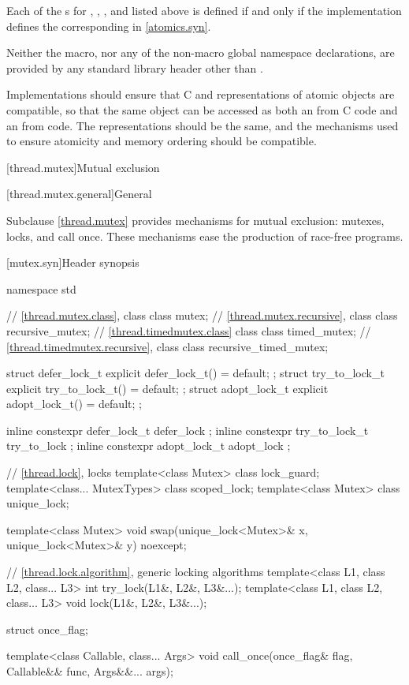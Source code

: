 \pnum
Each of the s for
, , , and 
listed above is defined if and only if the implementation defines
the corresponding  in \ref{atomics.syn}.

\pnum
Neither the  macro,
nor any of the non-macro global namespace declarations,
are provided by any \Cpp{} standard library header
other than .

\pnum
\recommended
Implementations should ensure
that C and \Cpp{} representations of atomic objects are compatible,
so that the same object can be accessed as both an 
from C code and an  from \Cpp{} code.
The representations should be the same, and
the mechanisms used to ensure atomicity and memory ordering
should be compatible.

[thread.mutex]{Mutual exclusion}

[thread.mutex.general]{General}

\pnum
Subclause \ref{thread.mutex} provides mechanisms for mutual exclusion: mutexes, locks, and call
once. These mechanisms ease the production of race-free
programs.

[mutex.syn]{Header  synopsis}

%
\begin{codeblock}
namespace std {
  // \ref{thread.mutex.class}, class 
  class mutex;
  // \ref{thread.mutex.recursive}, class 
  class recursive_mutex;
  // \ref{thread.timedmutex.class} class 
  class timed_mutex;
  // \ref{thread.timedmutex.recursive}, class 
  class recursive_timed_mutex;

  struct defer_lock_t { explicit defer_lock_t() = default; };
  struct try_to_lock_t { explicit try_to_lock_t() = default; };
  struct adopt_lock_t { explicit adopt_lock_t() = default; };

  inline constexpr defer_lock_t  defer_lock { };
  inline constexpr try_to_lock_t try_to_lock { };
  inline constexpr adopt_lock_t  adopt_lock { };

  // \ref{thread.lock}, locks
  template<class Mutex> class lock_guard;
  template<class... MutexTypes> class scoped_lock;
  template<class Mutex> class unique_lock;

  template<class Mutex>
    void swap(unique_lock<Mutex>& x, unique_lock<Mutex>& y) noexcept;

  // \ref{thread.lock.algorithm}, generic locking algorithms
  template<class L1, class L2, class... L3> int try_lock(L1&, L2&, L3&...);
  template<class L1, class L2, class... L3> void lock(L1&, L2&, L3&...);

  struct once_flag;

  template<class Callable, class... Args>
    void call_once(once_flag& flag, Callable&& func, Args&&... args);
}
\end{codeblock}

